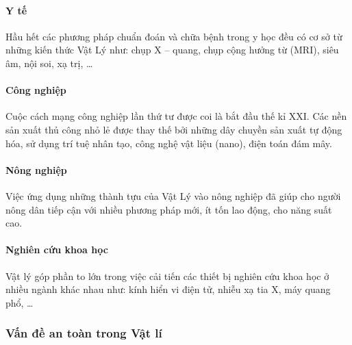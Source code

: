 \begin{tomtat}
	\paragraph{Y tế}
	Hầu hết các phương pháp chuẩn đoán và chữa bệnh trong y học đều có cơ sở từ những kiến thức Vật Lý như: chụp X – quang, chụp cộng hưởng từ (MRI), siêu âm, nội soi, xạ trị, \dots
	\paragraph{Công nghiệp}
	Cuộc cách mạng công nghiệp lần thứ tư được coi là bắt đầu thế kỉ XXI. Các nền sản xuất thủ công nhỏ lẻ được thay thế bởi những dây chuyền sản xuất tự động hóa, sử dụng trí tuệ nhân tạo, công nghệ vật liệu (nano), điện toán đám mây.
	\paragraph{Nông nghiệp}
	Việc ứng dụng những thành tựu của Vật Lý vào nông nghiệp đã giúp cho người nông dân tiếp cận với nhiều phương pháp mới, ít tốn lao động, cho năng suất cao. 
	\paragraph{Nghiên cứu khoa học}
	Vật lý góp phần to lớn trong việc cải tiến các thiết bị nghiên cứu khoa học ở nhiều ngành khác nhau như: kính hiển vi điện tử, nhiễu xạ tia X, máy quang phổ, \dots
\end{tomtat}
\subsubsection{Vấn đề an toàn trong Vật lí}

